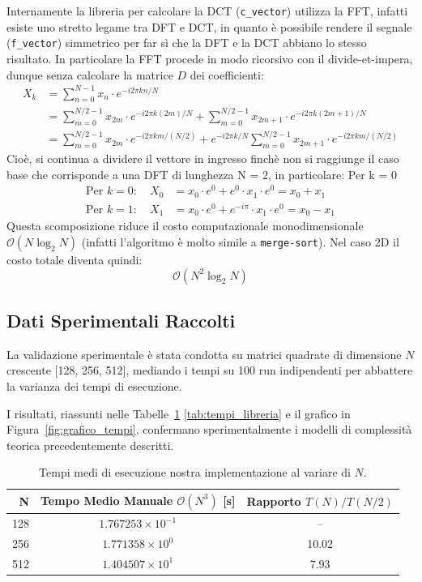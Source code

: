 \documentclass{article}
\begin{document}
Internamente la libreria per calcolare la DCT (\texttt{c\_vector}) utilizza la FFT, infatti esiste uno stretto legame tra DFT e DCT, in quanto 
è possibile rendere il segnale (\texttt{f\_vector}) simmetrico per far sì che la DFT e la DCT abbiano lo stesso risultato. 
In particolare la FFT procede in modo ricorsivo con il divide-et-impera, dunque senza calcolare la matrice $D$ dei coefficienti:
\[
\begin{aligned}
X_k &= \sum_{n=0}^{N-1} x_n \cdot e^{-i2\pi kn/N} \\
&= \sum_{m=0}^{N/2-1} x_{2m} \cdot e^{-i2\pi k(2m)/N} + \sum_{m=0}^{N/2-1} x_{2m+1} \cdot e^{-i2\pi k(2m+1)/N} \\
&= \sum_{m=0}^{N/2-1} x_{2m} \cdot e^{-i2\pi km/(N/2)} + e^{-i2\pi k/N} \sum_{m=0}^{N/2-1} x_{2m+1} \cdot e^{-i2\pi km/(N/2)}
\end{aligned}
\]
Cioè, si continua a dividere il vettore in ingresso finchè non si raggiunge il caso base che corrisponde a una 
DFT di lunghezza N = 2, in particolare:
Per k = 0
\begin{align*}
\text{Per } k = 0: \quad X_0 &= x_0 \cdot e^{0} + e^{0} \cdot x_1 \cdot e^{0} = x_0 + x_1 \\
\text{Per } k = 1: \quad X_1 &= x_0 \cdot e^{0} + e^{-i\pi} \cdot x_1 \cdot e^{0} = x_0 - x_1
\end{align*}
Questa scomposizione riduce il costo computazionale monodimensionale $\mathcal{O}(N \log_2 N)$ (infatti l'algoritmo è molto simile a \texttt{merge-sort}).
Nel caso 2D il costo totale diventa quindi:
\begin{equation}
	\mathcal{O}(N^2 \log_2 N)
\end{equation}

\subsection{Dati Sperimentali Raccolti}
La validazione sperimentale è stata condotta su matrici quadrate di dimensione $N$ crescente [128, 256, 512], 
mediando i tempi su 100 run indipendenti per abbattere la varianza dei tempi di esecuzione. 

I risultati, riassunti nelle Tabelle~\ref{tab:tempi_manuale} \ref{tab:tempi_libreria} e il grafico in 
Figura~\ref{fig:grafico_tempi}, confermano sperimentalmente i modelli di complessità teorica precedentemente descritti.

\begin{table}[H]
	\centering
	\begin{tabular}{rcc}
		\hline
		\textbf{N} & \textbf{Tempo Medio Manuale} $\mathcal{O}(N^3)$ \textbf{[s]} & \textbf{Rapporto} $T(N)/T(N/2)$ \\ \hline
		128 & $1.767253 \times 10^{-1}$ & --    \\
		256 & $1.771358 \times 10^{0}$  & 10.02 \\
		512 & $1.404507 \times 10^{1}$  & 7.93  \\ \hline
	\end{tabular}
	\caption{Tempi medi di esecuzione nostra implementazione al variare di $N$.}
	\label{tab:tempi_manuale}
\end{table}
\end{document}
